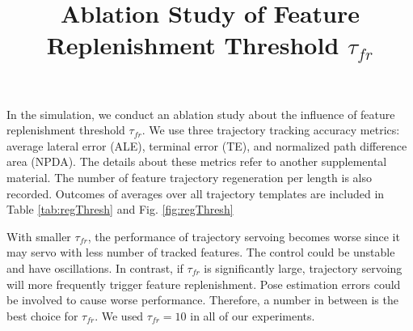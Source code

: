 \documentclass[11pt]{article}
\title{Ablation Study of Feature Replenishment Threshold $\tau_{fr}$}
\newcommand{\TODO}[1]{\textcolor{red}{[TODO: #1]}}
\begin{document}
In the simulation, we conduct an ablation study about the influence of 
feature replenishment threshold $\tau_{fr}$. 
We use three trajectory tracking accuracy metrics: average lateral error (ALE),
terminal error (TE), and normalized path difference area (NPDA).
The details about these metrics refer to another supplemental material.
The number of feature trajectory regeneration per length is also recorded.
Outcomes of averages over all trajectory templates are included in 
Table \ref{tab:regThresh} and Fig. \ref{fig:regThresh}

With smaller $\tau_{fr}$, the performance of trajectory servoing becomes 
worse since it may servo with less number of tracked features. 
The control could be unstable and have oscillations. 
In contrast, if $\tau_{fr}$ is significantly large, trajectory servoing 
will more frequently trigger feature replenishment. 
Pose estimation errors could be involved to cause worse performance.
Therefore, a number in between is the best choice for $\tau_{fr}$. 
We used $\tau_{fr}=10$ in all of our experiments.


\begin{figure}[h]
\begin{minipage}[t]{\textwidth}
\centering
\vspace*{-0.5em}
\end{minipage}
\vspace*{-0.5em}
\end{figure}
\end{document}
